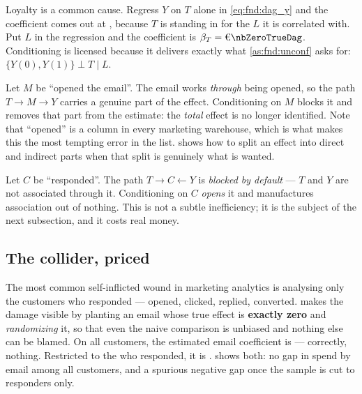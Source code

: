 \begin{description}[leftmargin=*, style=nextline]
  \item[Confounder --- a backdoor path: $T \leftarrow L \rightarrow Y$. \textmd{\textbf{Adjust.}}]
    Loyalty is a common cause. Regress $Y$ on $T$ alone in \cref{eq:fnd:dag_y} and the
    coefficient comes out at \eur{\nbZeroPooledNaive}, because $T$ is standing in for the $L$ it
    is correlated with. Put $L$ in the regression and the coefficient is $\beta_T =
    \eur{\nbZeroTrueDag}$. Conditioning is licensed because it delivers exactly what
    \cref{as:fnd:unconf} asks for: $\{Y(0), Y(1)\} \perp T \mid L$.
  \item[Mediator --- on the causal path: $T \rightarrow M \rightarrow Y$. \textmd{\textbf{Do not adjust.}}]
    Let $M$ be ``opened the email''. The email works \emph{through} being opened, so the path
    $T \rightarrow M \rightarrow Y$ carries a genuine part of the effect. Conditioning on $M$
    blocks it and removes that part from the estimate: the \emph{total} effect is no longer
    identified. Note that ``opened'' is a column in every marketing warehouse, which is what
    makes this the most tempting error in the list.  shows how to split an effect
    into direct and indirect parts when that split is genuinely what is wanted.
  \item[Collider --- a common effect: $T \rightarrow C \leftarrow Y$. \textmd{\textbf{Do not condition.}}]
    Let $C$ be ``responded''. The path $T \rightarrow C \leftarrow Y$ is \emph{blocked by
    default} --- $T$ and $Y$ are not associated through it. Conditioning on $C$ \emph{opens} it
    and manufactures association out of nothing. This is not a subtle inefficiency; it is the
    subject of the next subsection, and it costs real money.
\end{description}

\subsection*{The collider, priced}

The most common self-inflicted wound in marketing analytics is analysing only the customers who
responded --- opened, clicked, replied, converted.  makes the damage
visible by planting an email whose true effect is \textbf{exactly zero} and \emph{randomizing}
it, so that even the naive comparison is unbiased and nothing else can be blamed. On all
\nbZeroColliderN{} customers, the estimated email coefficient is \eur{\nbZeroColliderAll} ---
correctly, nothing. Restricted to the \pc{\nbZeroColliderShare} who responded, it is
\eur{\nbZeroColliderResp}.  shows both: no gap in spend by email
among all customers, and a spurious negative gap once the sample is cut to responders only.

